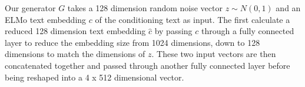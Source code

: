 Our generator $G$ takes a 128 dimension random noise vector $z \sim N(0, 1)$ and an ELMo text embedding $c$ of the conditioning text as input. The  first calculate a reduced 128 dimension text embedding $\hat{c}$ by passing $c$ through a fully connected layer to reduce the embedding size from 1024 dimensions, down to 128 dimensions to match the dimensions of $z$. These two input vectors are then concatenated together and passed through another fully connected layer before being reshaped into a 4 x 512 dimensional vector.